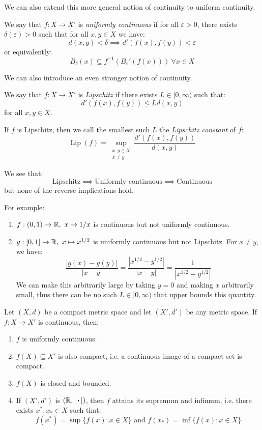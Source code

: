 \documentclass[../main.tex]{subfiles}
\begin{document}
We can also extend this more general notion of continuity to uniform continuity.
\begin{definition}
  We say that $f: X \to X'$ is \textit{uniformly continuous} if for all $\varepsilon > 0$, there exists $\delta(\varepsilon) > 0$ such that for all $x, y \in X$ we have:
  \[
    d(x, y) < \delta \implies d'(f(x), f(y)) < \varepsilon
  \]
  or equivalently:
  \[
    B_{\delta}(x) \subseteq f^{-1}(B_{\varepsilon}'(f(x)))\ \forall x \in X
  \]
\end{definition}
We can also introduce an even stronger notion of continuity.
\begin{definition}[Lipschitz]
  We say that $f: X \to X'$ is \textit{Lipschitz} if there exists $L \in [0, \infty)$ such that:
  \[
    d'(f(x), f(y)) \leq L d(x, y)
  \]
  for all $x, y \in X$.
\end{definition}
\begin{definition}
  If $f$ is Lipschitz, then we call the smallest such $L$ the \textit{Lipschitz constant} of $f$:
  \[
    \operatorname{Lip}(f) = \sup_{\substack{x, y \in X \\ x \neq y}} \frac{d'(f(x), f(y))}{d(x, y)}
  \]
\end{definition}
\begin{remark}
  We see that:
  \[
    \text{Lipschitz} \implies \text{Uniformly continuous} \implies \text{Continuous}
  \]
  but none of the reverse implications hold.

  For example:
  \begin{enumerate}
    \item $f: (0, 1) \to \mathbb{R},\ x \mapsto 1/x$ is continuous but not uniformly continuous.
    \item $g: [0, 1] \to \mathbb{R},\ x \mapsto x^{1/2}$ is uniformly continuous but not Lipschitz.
      For $x \neq y$, we have:
      \[
        \frac{|g(x) - g(y)|}{|x - y|} = \frac{|x^{1/2} - y^{1/2}|}{|x - y|} = \frac{1}{|x^{1/2} + y^{1/2}|}
      \]
      We can make this arbitrarily large by taking $y = 0$ and making $x$ arbitrarily small, thus there can be no such $L \in [0, \infty)$ that upper bounds this quantity.
  \end{enumerate}
\end{remark}
\begin{theorem}
  Let $(X, d)$ be a compact metric space and let $(X', d')$ be any metric space.
  If $f: X \to X'$ is continuous, then: \label{ctsProps}
  \begin{enumerate}
    \item $f$ is uniformly continuous.
    \item $f(X) \subseteq X'$ is also compact, i.e. a continuous image of a compact set is compact.
    \item $f(X)$ is closed and bounded.
    \item If $(X', d')$ is $(\mathbb{R}, |{\hspace{0.18em}\boldsymbol{\cdot}\hspace{0.18em}}|)$, then $f$ attains its supremum and infimum, i.e. there exists $x^{*}, x_{*} \in X$ such that:
      \[
        f(x^{*}) = \sup\{f(x): x \in X\} \text{ and } f(x_{*}) = \inf\{f(x): x \in X\}
      \]
  \end{enumerate}
\end{theorem}
\end{document}
